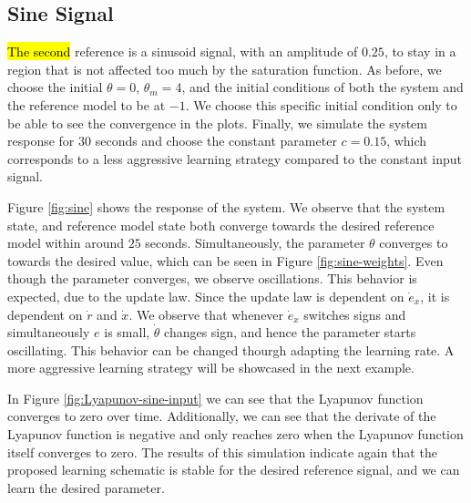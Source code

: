 \subsection{Sine Signal}
\hl{The second} reference is a sinusoid signal, with an amplitude of $0.25$, to stay in a region that is not affected too much by the saturation function. As before, we choose the initial $\theta = 0$, $\theta_m = 4$, and the initial conditions of both the system and the reference model to be at $-1$. We choose this specific initial condition only to be able to see the convergence in the plots. Finally, we simulate the system response for $30$ seconds and choose the constant parameter $c=0.15$, which corresponds to a less aggressive learning strategy compared to the constant input signal.

Figure \ref{fig:sine} shows the response of the system. We observe that the system state, and reference model state both converge towards the desired reference model within around $25$ seconds. Simultaneously, the parameter $\theta$ converges to towards the desired value, which can be seen in Figure \ref{fig:sine-weights}. Even though the parameter converges, we observe oscillations. This behavior is expected, due to the update law. Since the update law is dependent on $\dot e_x$, it is dependent on $\dot r$ and $\dot x$. We observe that whenever $\dot e_x$ switches signs and simultaneously $e$ is small, $\dot \theta$ changes sign, and hence the parameter starts oscillating. This behavior can be changed thourgh adapting the learning rate. A more aggressive learning strategy will be showcased in the next example.

In Figure \ref{fig:Lyapunov-sine-input} we can see that the Lyapunov function converges to zero over time. Additionally, we can see that the derivate of the Lyapunov function is negative and only reaches zero when the Lyapunov function itself converges to zero. The results of this simulation indicate again that the proposed learning schematic is stable for the desired reference signal, and we can learn the desired parameter.

